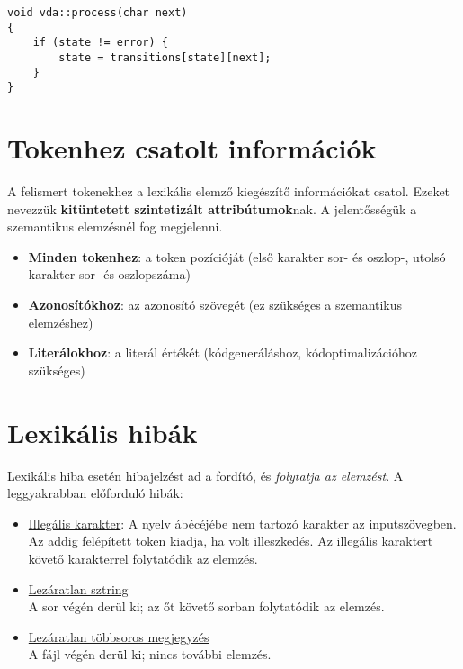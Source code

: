 \begin{lstlisting}[style=cppstyle, caption={VDA implementációja táblázattal}]
void vda::process(char next) 
{
	if (state != error) {
		state = transitions[state][next];
	}
}
\end{lstlisting}


\newpage
\section{Tokenhez csatolt információk}

A felismert tokenekhez a lexikális elemző kiegészítő információkat csatol. Ezeket nevezzük \textbf{kitüntetett szintetizált attribútumok}nak. A jelentősségük a szemantikus elemzésnél fog megjelenni.

\begin{itemize}
	\item \textbf{Minden tokenhez}: a token pozícióját (első karakter sor- és oszlop-, utolsó karakter sor- és oszlopszáma)
	\item \textbf{Azonosítókhoz}: az azonosító szövegét (ez szükséges a szemantikus elemzéshez)
	\item \textbf{Literálokhoz}: a literál értékét (kódgeneráláshoz, kódoptimalizációhoz szükséges)
\end{itemize}

\section{Lexikális hibák}

Lexikális hiba esetén hibajelzést ad a fordító, és \textit{folytatja az elemzést}. A leggyakrabban előforduló hibák:
\begin{itemize}
	\item \underline{Illegális karakter}: A nyelv ábécéjébe nem tartozó karakter az inputszövegben. \\
	Az addig felépített token kiadja, ha volt illeszkedés. 
	Az illegális karaktert követő karakterrel folytatódik az elemzés.
	
	\item \underline{Lezáratlan sztring} \\
	A sor végén derül ki; az őt követő sorban folytatódik az elemzés.
	
	\item \underline{Lezáratlan többsoros megjegyzés} \\
	A fájl végén derül ki; nincs további elemzés.
\end{itemize}


